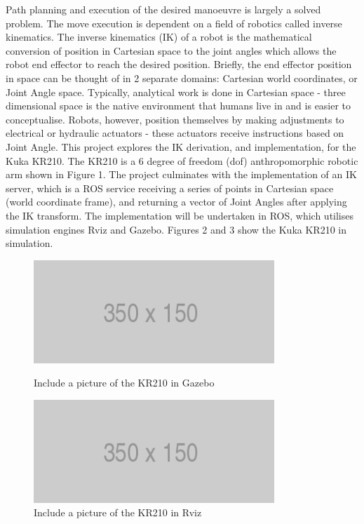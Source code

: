 \documentclass[a4paper]{article}
\begin{document}
Path planning and execution of the desired manoeuvre is largely a solved problem. The move execution is dependent on a field of robotics called inverse kinematics. The inverse kinematics (IK) of a robot is the mathematical conversion of position in Cartesian space to the joint angles which allows the robot end effector to reach the desired position. Briefly, the end effector position in space can be thought of in 2 separate domains: Cartesian world coordinates, or Joint Angle space. Typically, analytical work is done in Cartesian space - three dimensional space is the native environment that humans live in and is easier to conceptualise. Robots, however, position themselves by making adjustments to electrical or hydraulic actuators - these actuators receive instructions based on Joint Angle. This project explores the IK derivation, and implementation, for the Kuka KR210. The KR210 is a 6 degree of freedom (dof) anthropomorphic robotic arm shown in Figure 1. The project culminates with the implementation of an IK server, which is a ROS service receiving a series of points in Cartesian space (world coordinate frame), and returning a vector of Joint Angles after applying the IK transform. The implementation will be undertaken in ROS, which utilises simulation engines Rviz and Gazebo. Figures 2 and 3 show the Kuka KR210 in simulation.

\begin{figure}[h]
\centering
\begin{minipage}{0.45\linewidth}
\centering
\includegraphics[scale=0.5]{placeholder}
\caption{Include a picture of the KR210 in Gazebo}
\end{minipage}
\hspace{0.5cm}
\begin{minipage}{0.45\linewidth}
\centering
\includegraphics[scale=0.5]{placeholder}
\caption{Include a picture of the KR210 in Rviz}
\end{minipage}
\end{figure}
\end{document}
